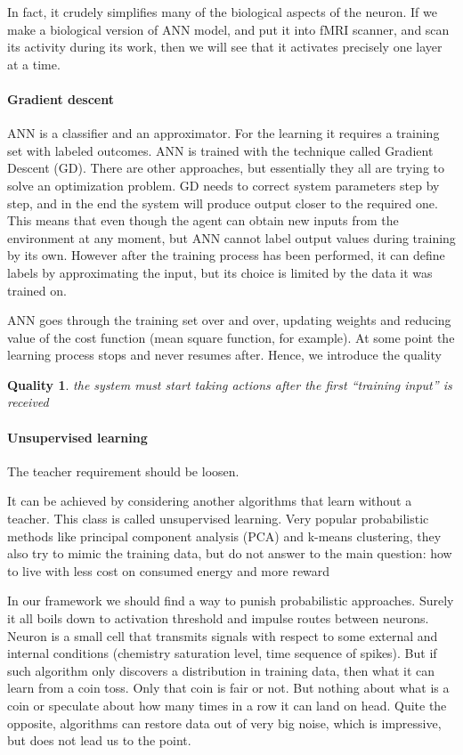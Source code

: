 \documentclass{article}
\newtheorem{Qual}{Quality}
\begin{document}
In fact, it crudely simplifies many of the biological aspects of the neuron. If we make a biological version of ANN model, and put it into fMRI scanner, and scan its activity during its work, then we will see that it activates precisely one layer at a time.

\paragraph{Gradient descent}
ANN is a classifier and an approximator. 
For the learning it requires a training set with labeled outcomes. 
ANN is trained with the technique called Gradient Descent (GD). There are other approaches, but essentially they all are trying to solve an optimization problem.
GD needs to correct system parameters step by step, and in the end the system will produce output closer to the required one.
This means that even though the agent can obtain new inputs from the environment at any moment, but ANN cannot label output values during training by its own. However after the training process has been performed, it can define labels by approximating the input, but its choice is limited by the data it was trained on.

ANN goes through the training set over and over, updating weights and reducing value of the cost function (mean square function, for example). At some point the learning process stops and never resumes after. Hence, we introduce the quality 

\begin{Qual}\label{q1}
the system must start taking actions after the first “training input” is received
\end{Qual}

\paragraph{Unsupervised learning}
The teacher requirement should be loosen. 

It can be achieved by considering another algorithms that learn without a teacher. This class is called unsupervised learning. Very popular probabilistic methods like principal component analysis (PCA) and k-means clustering, they also try to mimic the training data, but do not answer to the main question: how to live with less cost on consumed energy and more reward

In our framework we should find a way to punish probabilistic approaches. Surely it all boils down to activation threshold and impulse routes between neurons.
Neuron is a small cell that transmits signals with respect to some external and internal conditions (chemistry saturation level, time sequence of spikes). But if such algorithm only discovers a distribution in training data, then what it can learn from a coin toss. Only that coin is fair or not. But nothing about what is a coin or speculate about how many times in a row it can land on head. Quite the opposite, algorithms can restore data out of very big noise, which is impressive, but does not lead us to the point.
\end{document}
